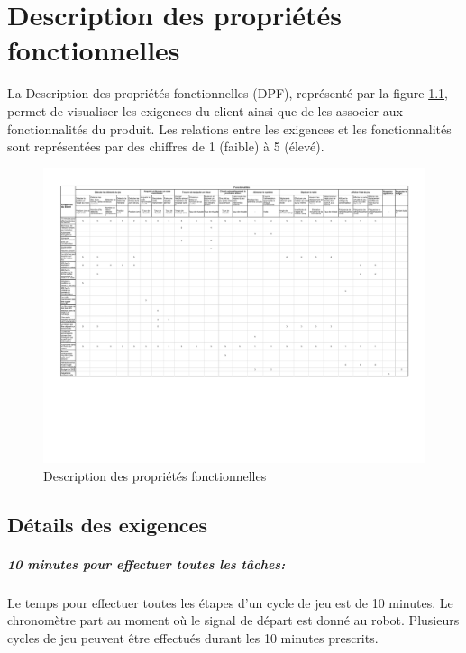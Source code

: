\chapter{Description des propriétés fonctionnelles}
La Description des propriétés fonctionnelles (DPF), représenté par la figure \ref{fig:dpf}, permet de visualiser les exigences du client ainsi que de les associer aux fonctionnalités du produit.
Les relations entre les exigences et les fonctionnalités sont représentées par des chiffres de 1 (faible) à 5 (élevé).



\begin{landscape}
    \begin{figure}[h]
      \caption{Description des propriétés fonctionnelles}
      \label{fig:dpf}
      \includegraphics[scale=0.82]{resources/dpf.pdf}
    \end{figure}
\end{landscape}


\section{Détails des exigences}

\paragraph{10 minutes pour effectuer toutes les tâches:}
Le temps pour effectuer toutes les étapes d'un cycle de jeu est de 10 minutes. Le chronomètre part au moment où le signal de départ est donné au robot.
Plusieurs cycles de jeu peuvent être effectués durant les 10 minutes prescrits.

